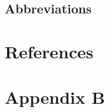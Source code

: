 \conditionalClearPage


\conditionalClearPage


\conditionalClearPage


\begin{changemargin}{0.8cm}{0.8cm}

~\vfill{}

\section*{Abbreviations}



\vskip 2.5cm

\end{changemargin}

\conditionalClearPage


\tableofcontents

\conditionalClearPage

\pagestyle{full}











\appendix
\renewcommand\chaptername{Appendix}

\chapter{References}

\printbibliography[heading=none,title={}]

\renewcommand{\thechapter}{B}
\renewcommand\chaptername{Appendix B}

\chapter{Appendix B}


